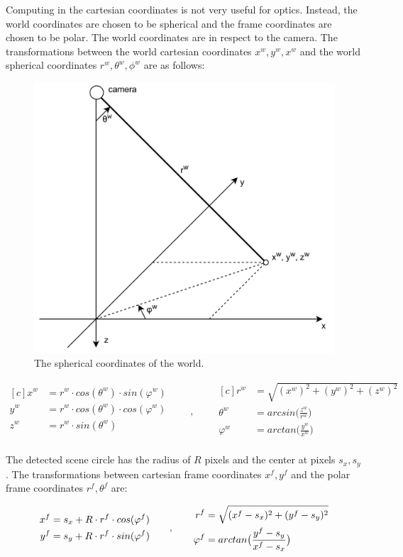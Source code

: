\documentclass[a4paper,12pt,titlepage, twoside]{article}
\numberwithin{figure}{section}
\begin{document}
Computing in the cartesian coordinates is not very useful for optics. Instead, the world coordinates are chosen to be spherical and the frame coordinates are chosen to be polar. The world coordinates are in respect to the camera. 
The transformations between the world cartesian coordinates $x^w, y^w, x^w$ and the world spherical coordinates $r^w, \theta^w, \phi^w$ are as follows:

\begin{figure}[h]
\centering
\includegraphics[width=0.5\linewidth]{fig/sphere.png}
\caption{The spherical coordinates of the world.}
\label{fig:sphere}
\end{figure}


\begin{equation}
\begin{aligned}[c]
x^w &= r^w \cdot cos(\theta^w) \cdot sin(\varphi^w) \\
y^w &= r^w \cdot cos(\theta^w) \cdot cos(\varphi^w) \\
z^w &= r^w \cdot sin(\theta^w) \\
\end{aligned}
\qquad,\qquad
\begin{aligned}[c]
r^w &= \sqrt{(x^w)^2 + (y^w)^2 + (z^w)^2} \\
\theta^w &= arcsin\Big(\frac{z^w}{r^w}\Big) \\
\varphi^w &= arctan\Big(\frac{y^w}{x^w}\Big) \\
\end{aligned}
\end{equation}



The detected scene circle has the radius of $R$ pixels and the center at pixels $s_x, s_y$. The transformations between cartesian frame coordinates $x^f, y^f$ and the polar frame coordinates $r^f, \theta^f$ are:

\begin{equation}
\begin{aligned}[c]
x^f &= s_x + R \cdot r^f \cdot cos(\varphi^f) \\
y^f &= s_y + R \cdot r^f \cdot sin(\varphi^f) \\
\end{aligned}
\qquad,\qquad
\begin{aligned}[c]
r^f &= \sqrt{(x^f - s_x)^2 + (y^f - s_y)^2} \\
\varphi^f &= arctan\big{(}\frac{y^f - s_y}{x^f - s_x}\big{)}
\end{aligned}
\end{equation}
\end{document}
